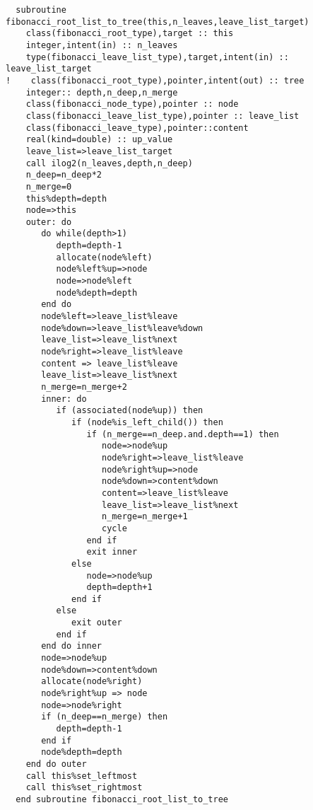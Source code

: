 \begin{Verbatim}
  subroutine fibonacci_root_list_to_tree(this,n_leaves,leave_list_target)
    class(fibonacci_root_type),target :: this
    integer,intent(in) :: n_leaves
    type(fibonacci_leave_list_type),target,intent(in) :: leave_list_target
!    class(fibonacci_root_type),pointer,intent(out) :: tree
    integer:: depth,n_deep,n_merge
    class(fibonacci_node_type),pointer :: node
    class(fibonacci_leave_list_type),pointer :: leave_list
    class(fibonacci_leave_type),pointer::content
    real(kind=double) :: up_value
    leave_list=>leave_list_target
    call ilog2(n_leaves,depth,n_deep)
    n_deep=n_deep*2
    n_merge=0
    this%depth=depth
    node=>this
    outer: do
       do while(depth>1)
          depth=depth-1
          allocate(node%left)
          node%left%up=>node
          node=>node%left
          node%depth=depth
       end do
       node%left=>leave_list%leave
       node%down=>leave_list%leave%down
       leave_list=>leave_list%next
       node%right=>leave_list%leave
       content => leave_list%leave
       leave_list=>leave_list%next
       n_merge=n_merge+2
       inner: do
          if (associated(node%up)) then
             if (node%is_left_child()) then
                if (n_merge==n_deep.and.depth==1) then
                   node=>node%up
                   node%right=>leave_list%leave
                   node%right%up=>node
                   node%down=>content%down
                   content=>leave_list%leave
                   leave_list=>leave_list%next
                   n_merge=n_merge+1
                   cycle
                end if
                exit inner
             else
                node=>node%up
                depth=depth+1
             end if
          else
             exit outer
          end if
       end do inner
       node=>node%up
       node%down=>content%down
       allocate(node%right)
       node%right%up => node
       node=>node%right
       if (n_deep==n_merge) then
          depth=depth-1
       end if
       node%depth=depth
    end do outer
    call this%set_leftmost
    call this%set_rightmost
  end subroutine fibonacci_root_list_to_tree
\end{Verbatim}


